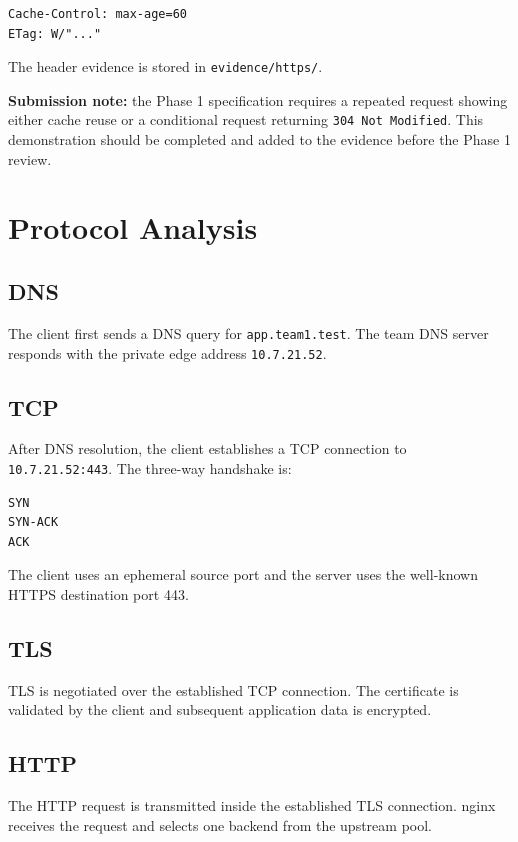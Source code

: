 \documentclass[11pt,a4paper]{article}
\begin{document}
\begin{lstlisting}
Cache-Control: max-age=60
ETag: W/"..."
\end{lstlisting}

The header evidence is stored in \texttt{evidence/https/}.

\textbf{Submission note:} the Phase 1 specification requires a repeated
request showing either cache reuse or a conditional request returning
\texttt{304 Not Modified}. This demonstration should be completed and
added to the evidence before the Phase 1 review.

\section{Protocol Analysis}

\subsection{DNS}

The client first sends a DNS query for \texttt{app.team1.test}. The
team DNS server responds with the private edge address
\texttt{10.7.21.52}.

\subsection{TCP}

After DNS resolution, the client establishes a TCP connection to
\texttt{10.7.21.52:443}. The three-way handshake is:

\begin{lstlisting}
SYN
SYN-ACK
ACK
\end{lstlisting}

The client uses an ephemeral source port and the server uses the
well-known HTTPS destination port 443.

\subsection{TLS}

TLS is negotiated over the established TCP connection. The certificate
is validated by the client and subsequent application data is encrypted.

\subsection{HTTP}

The HTTP request is transmitted inside the established TLS connection.
nginx receives the request and selects one backend from the upstream pool.
\end{document}
